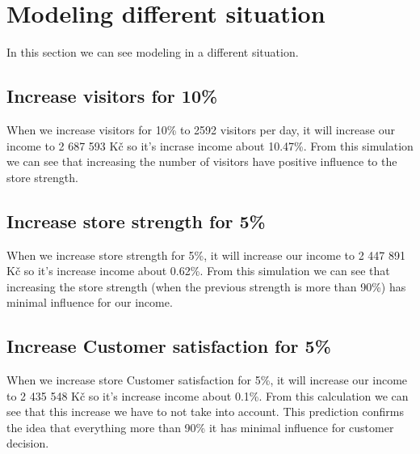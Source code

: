 
\chapter{Modeling different situation} \label{apendixc}

In this section we can see modeling in a different situation.

\section{Increase visitors for 10\%}
When we increase visitors for 10\% to 2592 visitors per day, it will increase our income to 2 687 593 Kč so it's incrase income about 10.47\%.
From this simulation we can see that increasing the number of visitors have positive influence to the store strength.\\
\section{Increase store strength for 5\%}
When we increase store strength for 5\%, it will increase our income to 2 447 891 Kč so it's increase income about 0.62\%.
From this simulation we can see that increasing the store strength (when the previous strength is more than 90\%) has minimal influence for our income.\\
\section{Increase Customer satisfaction for 5\%}
When we increase store Customer satisfaction for 5\%, it will increase our income to 2 435 548 Kč so it's increase income about 0.1\%.
From this calculation we can see that this increase we have to not take into account.
This prediction confirms the idea that everything more than 90\% it has minimal influence for customer decision.
